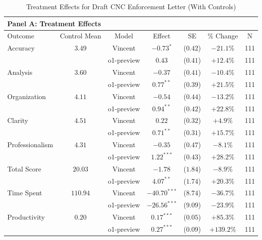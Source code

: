 \begin{table}[!htbp]
\centering
\caption{Treatment Effects for Draft CNC Enforcement Letter (With Controls)}
\label{tab:task6_effects_controls}
\vspace{0.3cm}
\begin{tabular}{lcccccc}
\multicolumn{7}{l}{\textbf{Panel A: Treatment Effects}} \\
\hline\hline
Outcome & Control Mean & Model & Effect & SE & \% Change & N \\
\hline
\multirow{2}{*}{Accuracy} & \multirow{2}{*}{$3.49$} & Vincent & $-0.73^{*}$ & ($0.42$) & $-21.1\%$ & 111 \\
& & o1-preview & $0.43$ & ($0.41$) & $+12.4\%$ & 111 \\
\hline
\multirow{2}{*}{Analysis} & \multirow{2}{*}{$3.60$} & Vincent & $-0.37$ & ($0.41$) & $-10.4\%$ & 111 \\
& & o1-preview & $0.77^{**}$ & ($0.39$) & $+21.5\%$ & 111 \\
\hline
\multirow{2}{*}{Organization} & \multirow{2}{*}{$4.11$} & Vincent & $-0.54$ & ($0.44$) & $-13.2\%$ & 111 \\
& & o1-preview & $0.94^{**}$ & ($0.42$) & $+22.8\%$ & 111 \\
\hline
\multirow{2}{*}{Clarity} & \multirow{2}{*}{$4.51$} & Vincent & $0.22$ & ($0.32$) & $+4.9\%$ & 111 \\
& & o1-preview & $0.71^{**}$ & ($0.31$) & $+15.7\%$ & 111 \\
\hline
\multirow{2}{*}{Professionalism} & \multirow{2}{*}{$4.31$} & Vincent & $-0.35$ & ($0.47$) & $-8.1\%$ & 111 \\
& & o1-preview & $1.22^{***}$ & ($0.43$) & $+28.2\%$ & 111 \\
\hline
\multirow{2}{*}{Total Score} & \multirow{2}{*}{$20.03$} & Vincent & $-1.78$ & ($1.84$) & $-8.9\%$ & 111 \\
& & o1-preview & $4.07^{**}$ & ($1.74$) & $+20.3\%$ & 111 \\
\hline
\multirow{2}{*}{Time Spent} & \multirow{2}{*}{$110.94$} & Vincent & $-40.70^{***}$ & ($8.74$) & $-36.7\%$ & 111 \\
& & o1-preview & $-26.56^{***}$ & ($9.09$) & $-23.9\%$ & 111 \\
\hline
\multirow{2}{*}{Productivity} & \multirow{2}{*}{$0.20$} & Vincent & $0.17^{***}$ & ($0.05$) & $+85.3\%$ & 111 \\
& & o1-preview & $0.27^{***}$ & ($0.09$) & $+139.2\%$ & 111 \\
\hline
\end{tabular}


\end{table}
